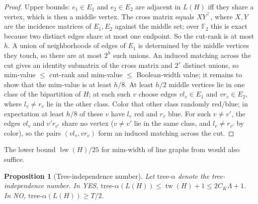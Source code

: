 \documentclass[11pt,letterpaper]{article}
\newtheorem{proposition}[theorem]{Proposition}
\theoremstyle{definition}
\theoremstyle{remark}
\newcommand{\F}{\mathbb F}
\DeclareMathOperator{\tw}{tw}
\DeclareMathOperator{\bw}{bw}
\begin{document}
\begin{proof}
Upper bounds: \(e_1\in E_1\) and \(e_2\in E_2\) are adjacent in \(L(H)\) iff
they share a vertex, which is then a middle vertex. The cross matrix equals
\(XY^{\top}\), where \(X,Y\) are the incidence matrices of \(E_1,E_2\)
against the middle set; over \(\F_2\) this is exact because two distinct
edges share at most one endpoint. So the cut-rank is at most \(h\). A union
of neighborhoods of edges of \(E_1\) is determined by the middle vertices
they touch, so there are at most \(2^h\) such unions. An induced matching
across the cut gives an identity submatrix of the cross matrix and \(2^s\)
distinct unions, so mim-value \(\le\) cut-rank and mim-value \(\le\)
Boolean-width value; it remains to show that the mim-value is at least
\(h/8\). At least \(h/2\) middle vertices lie in one class of the
bipartition of \(H\); at each such \(v\) choose edges \(vl_v\in E_1\) and
\(vr_v\in E_2\), where \(l_v\ne r_v\) lie in the other class. Color that
other class randomly red/blue; in expectation at least \(h/8\) of these
\(v\) have \(l_v\) red and \(r_v\) blue. For such \(v\ne v'\), the edges
\(vl_v\) and \(v'r_{v'}\) share no vertex (\(v\ne v'\) lie in the same
class, and \(l_v\ne r_{v'}\) by color), so the pairs
\((vl_v,vr_v)\) form an induced matching across the cut.
\end{proof}

The lower bound \(\bw(H)/25\) for mim-width of line graphs from
\cite[Theorem~4]{bmpy} would also suffice.

\begin{proposition}[Tree-independence number]\label{prop:treealpha}
Let \(\mathrm{tree}\text{-}\alpha\) denote the tree-independence number. In
YES, \(\mathrm{tree}\text{-}\alpha(L(H))\le\tw(H)+1\le2C_K\Lambda+1\). In NO,
\(\mathrm{tree}\text{-}\alpha(L(H))\ge T/2\).
\end{proposition}
\end{document}
